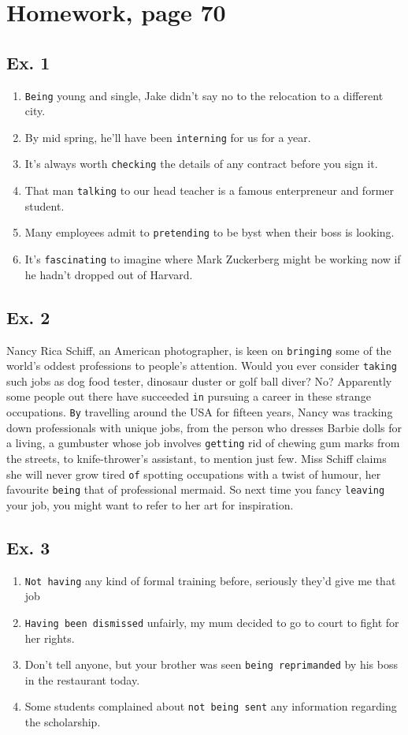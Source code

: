 \documentclass{article}
\begin{document}
\section{Homework, page 70}
\subsection{Ex. 1}
\begin{enumerate}
  \item {\tt Being} young and single, Jake didn't say no to the relocation to a different city.
  \item By mid spring, he'll have been {\tt interning} for us for a year.
  \item It's always worth {\tt checking} the details of any contract before you sign it.
  \item That man {\tt talking} to our head teacher is a famous enterpreneur and former student.
  \item Many employees admit to {\tt pretending} to be byst when their boss is looking.
  \item It's {\tt fascinating} to imagine where Mark Zuckerberg might be working now if he hadn't dropped out of Harvard.
\end{enumerate}

\subsection{Ex. 2}
Nancy Rica Schiff, an American photographer, is keen on {\tt bringing} some of the world's oddest professions to people's attention. Would you ever consider {\tt taking} such jobs as dog food tester, dinosaur duster or golf ball diver? No? Apparently some people out there have succeeded {\tt in} pursuing a career in these strange occupations. {\tt By} travelling around the USA for fifteen years, Nancy was tracking down professionals with unique jobs, from the person who dresses Barbie dolls for a living, a gumbuster whose job involves {\tt getting} rid of chewing gum marks from the streets, to knife-thrower's assistant, to mention just few. Miss Schiff claims she will never grow tired {\tt of} spotting occupations with a twist of humour, her favourite {\tt being} that of professional mermaid. So next time you fancy {\tt leaving} your job, you might want to refer to her art for inspiration.

\subsection{Ex. 3}
\begin{enumerate}
  \item {\tt Not having} any kind of formal training before, seriously they'd give me that job
  \item {\tt Having been dismissed} unfairly, my mum decided to go to court to fight for her rights.
  \item Don't tell anyone, but your brother was seen {\tt being reprimanded} by his boss in the restaurant today.
  \item Some students complained about {\tt not being sent} any information regarding the scholarship.
\end{enumerate}
\end{document}
